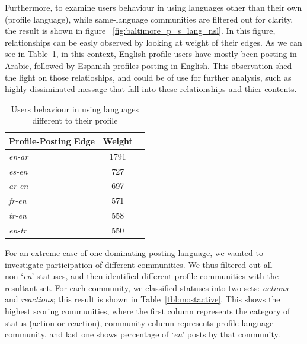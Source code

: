Furthermore, to examine users behaviour in using languages other than their own (profile language), while same-language 
communities are filtered out for clarity, the result is shown in figure ~\ref{fig:baltimore_p_s_lang_nsl}. 
In this figure, relationships can be easly observed by looking at weight of their edges. As we can see in Table~\ref{tbl:baltimoredifflang}, in this context,  
English profile users have mostly been posting in Arabic, followed by Espanish profiles posting in English. This observation shed the light on those relatioships, and could be of use for further analysis, such as highly dissiminated message that fall into these relationships and thier contents. 

\begin{table}[!htb]
\centering
\begin{tabular}{@{}lcr@{}}
\toprule
\textbf{Profile-Posting Edge} & \textbf{Weight} \\ \midrule
{\emph{en-ar}} & 1791 \\
{\emph{es-en}} & 727 \\
{\emph{ar-en}} & 697\\ 
{\emph{fr-en}} & 571 \\
{\emph{tr-en}} & 558 \\
{\emph{en-tr}} & 550 \\ \bottomrule
\end{tabular}
\caption{Users behaviour in using languages different to their profile}
\label{tbl:baltimoredifflang}
\end{table}

For an extreme case of one dominating posting language, we wanted to
investigate participation of different communities. We thus filtered
out all non-`{\emph{en}}' statuses, and then identified different
profile communities with the resultant set. For each community, we
classified statuses into two sets: {\emph{actions}} and
{\emph{reactions}}; this result is shown in
Table~\ref{tbl:mostactive}. This shows the highest scoring
communities, where the first column represents the category of status
(action or reaction), community column represents profile language
community, and last one shows percentage of `{\emph{en}}' posts by
that community.

